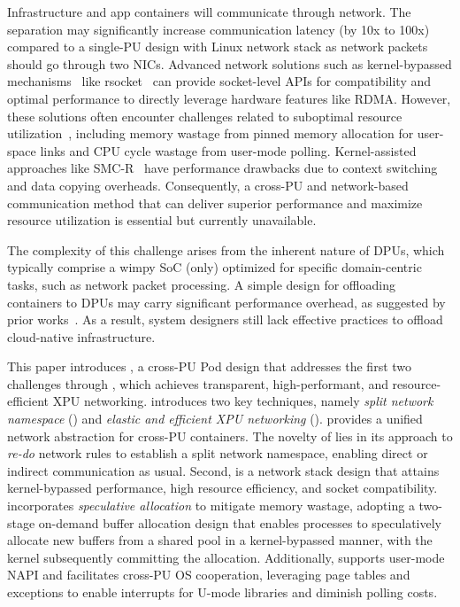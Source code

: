 Infrastructure and app containers will communicate through network.
The separation may significantly increase communication latency (by 10x to 100x) compared to a single-PU design with Linux network stack as network packets should go through two NICs.
Advanced network solutions such as kernel-bypassed mechanisms~\cite{10.5555/2616448.2616493, rsocket, f-stack, 10.1145/3341302.3342071, libvma} like rsocket~\cite{rsocket} can provide socket-level APIs for compatibility and optimal performance to directly leverage hardware features like RDMA.
However, these solutions often encounter challenges related to suboptimal resource utilization~\cite{10.1145/3477132.3483569}, including memory wastage from pinned memory allocation for user-space links and CPU cycle wastage from user-mode polling.
Kernel-assisted approaches like SMC-R~\cite{rfc7609} have performance drawbacks due to context switching and data copying overheads.
Consequently, a cross-PU and network-based communication method that can deliver superior performance and maximize resource utilization is essential but currently unavailable.


The complexity of this challenge arises from the inherent nature of DPUs, which typically comprise a wimpy SoC (only) optimized for specific domain-centric tasks, such as network packet processing.
A simple design for offloading containers to DPUs may carry significant performance overhead, as suggested by prior works~\cite{wei2022comprehensive, 10.1145/3477132.3483565, 10.1145/3503222.3507732}.
As a result, system designers still lack effective practices to offload cloud-native infrastructure.

This paper introduces \xpod, a cross-PU Pod design that addresses the first two challenges through \os, which achieves transparent, high-performant, and resource-efficient XPU networking.
\os introduces two key techniques, namely \emph{split network namespace} (\giptable) and \emph{elastic and efficient XPU networking} (\gsocket).
\giptable provides a unified network abstraction for cross-PU containers.
The novelty of \giptable lies in its approach to \emph{re-do} network rules to establish a split network namespace, enabling direct or indirect communication as usual.
Second, \gsocket is a network stack design that attains kernel-bypassed performance, high resource efficiency, and socket compatibility.
\gsocket incorporates \emph{speculative allocation} to mitigate memory wastage, adopting a two-stage on-demand buffer allocation design that enables processes to speculatively allocate new buffers from a shared pool in a kernel-bypassed manner, with the kernel subsequently committing the allocation.
Additionally, \gsocket supports user-mode NAPI and facilitates cross-PU OS cooperation, leveraging page tables and exceptions to enable interrupts for U-mode libraries and diminish polling costs.

